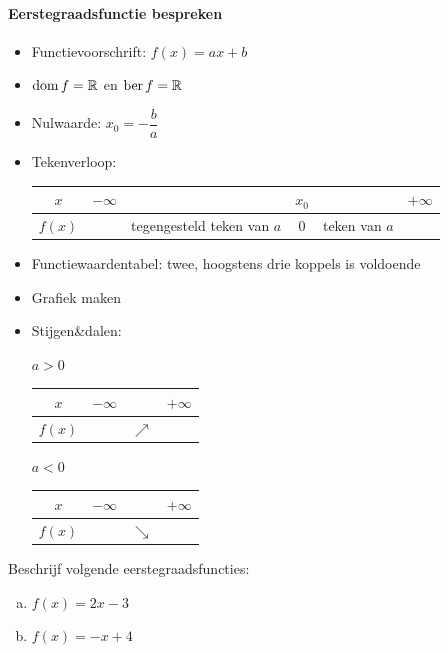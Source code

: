 \documentclass[12pt]{article}
\begin{document}
\paragraph*{Eerstegraadsfunctie bespreken}
\begin{mdframed}
\begin{itemize}
  \item Functievoorschrift: $f(x)=ax + b$
  \item $\dom f = \mathbb{R}$ en $\ber f = \mathbb{R}$
  \item Nulwaarde: $x_0=-\dfrac{b}{a}$
  \item Tekenverloop:
  \begin{center}
    \begin{tabular}{c|lp{2.5cm}cp{1.5cm}r}
    $x$ & $-\infty$ & & $x_0$ & & $+\infty$\\
    \hline
    $f(x)$ & & tegengesteld teken van $a$ & 0 & teken van $a$ &       
    \end{tabular}
  \end{center}
  \item Functiewaardentabel: twee, hoogstens drie koppels is voldoende
  \item Grafiek maken
  \item Stijgen\&dalen:\\
  \begin{minipage}{0.45\textwidth}
    \centering $a>0$\\
    \begin{tabular}{c|lcr}
    $x$ & $-\infty$ & & $+\infty$\\
    \hline
    $f(x)$ & & $\nearrow$ &       
    \end{tabular}
  \end{minipage}
  \begin{minipage}{0.45\textwidth}
    \centering $a<0$\\
    \begin{tabular}{c|lcr}
    $x$ & $-\infty$ & & $+\infty$\\
    \hline
    $f(x)$ & & $\searrow$ &       
    \end{tabular}
  \end{minipage}
\end{itemize}
\end{mdframed}

\begin{oefening}
Beschrijf volgende eerstegraadsfuncties:
\begin{enumerate}[(a)]
  \item $f(x)=2x-3$
  \item $f(x)=-x+4$
\end{enumerate}
\end{oefening}
\end{document}
